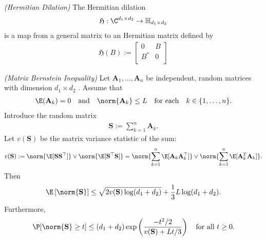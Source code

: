\begin{definition}
  \emph{(Hermitian Dilation)}
  The Hermitian dilation
  \begin{gather*}
    \mathfrak{H} : \C^{d_1 \times d_2} \to \mathbb{H}_{d_1 \times d_2}
  \end{gather*}
  is a map from a general matrix to an Hermitian matrix defined by
  \begin{gather}
    \label{ rmineq_hermitian_dilation } 
    \mathfrak{H}(B)
    :=
    \begin{bmatrix}
      0   & B \\
      B^* & 0 \\
    \end{bmatrix}
  \end{gather}
\end{definition}




\begin{theorem}
  \emph{(Matrix Bernstein Inequality)}
  \label{rmineq_bernstein}
  Let $\mathbf{A}_1, \ldots, \mathbf{A}_n$ be independent, random matrices with dimension 
  $d_1 \times d_2$
  . Assume that
    \begin{gather}
      \label{rmineq_bernstein_cond_1}
      \E(\mathbf{A}_k)=0\quad\text{and}\quad\norm{\mathbf{A}_k}\le L \quad \text{for each}\quad  k\in \{1,\ldots,n\}.
    \end{gather}
    Introduce the random matrix
      \begin{gather*}
        \mathbf{S}:=\sum_{k=1}^n \mathbf{A}_k.
      \end{gather*}
    Let $v(\mathbf{S})$ be the matrix variance statistic of the sum:
      \begin{align}
        \label{rmineq_bernstein_cond_2}
        v(\mathbf{S}):= \norm{\E[\mathbf{S}\mathbf{S}^\top ]} \lor \norm{\E[\mathbf{S}^\top \mathbf{S}]} 
             = \norm{\sum_{k=1}^n\E[\mathbf{A}_k\mathbf{A}_k^\top]} \lor \norm{\sum_{k=1}^n\E[\mathbf{A}_k^T \mathbf{A}_k]} .
      \end{align}
    Then
      \begin{align}
        \label{rmineq_bernstein_expectation_bound}
        \E \left[ \norm{\mathbf{S}} \right]\le \sqrt{2v(\mathbf{S})\log(d_1+d_2)} + \frac{1}{3}L\log(d_1+d_2).
      \end{align}
    Furthermore, 
      \begin{gather}
        \label{rmineq_bernstein_probability_bound}
        \P[\norm{\mathbf{S}}\ge t]\le(d_1+d_2)\exp\left(\frac{-t^2/2}{v(\mathbf{S})+Lt/3} \right)
        \quad
        \text{for all $t \ge 0$}
        .
      \end{gather}
\end{theorem}


